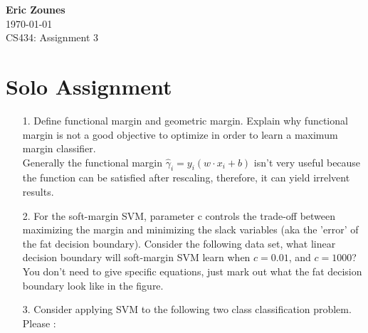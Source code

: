 \documentclass[12pt,letterpaper]{article}
\begin{document}
\setcounter{subsection}{2} 
\begin{flushright}
\end{flushright}
\begin{flushleft}
\textbf{Eric Zounes} \\
\today \\ 
CS434: Assignment 3
\end{flushleft}
\section[2]{Solo Assignment} 
\begin{enumerate} 
	\item[1.] Define functional margin and geometric margin. Explain why functional margin is not a good objective to optimize in order to learn a maximum margin classifier. \\
	Generally the functional margin $\hat{\gamma}_{i} = y_{i}(w\cdot x_{i} + b)$ isn't very useful because the function can be satisfied after rescaling, therefore, it can yield irrelvent results. 

	\item[2.] For the soft-margin SVM, parameter c controls the trade-off between maximizing the margin and minimizing the slack variables (aka the 'error' of the fat decision boundary). Consider the following data set, what linear decision boundary will soft-margin SVM learn when $c = 0.01$, and $c = 1000$? You don't need to give specific equations, just mark out what the fat decision boundary look like in the figure. \\
	
	\item[3.] Consider applying SVM to the following two class classification problem. Please : \\
	

\end{enumerate}
\end{document}
